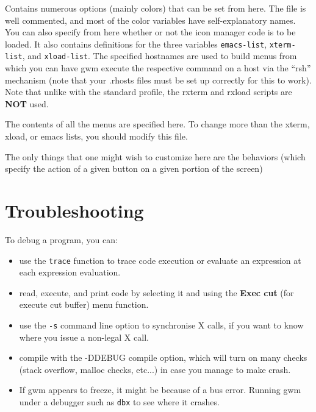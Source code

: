 \begin{description}

 Contains numerous options (mainly colors) that can be
set from here. The file is well commented, and most of the color
variables have self-explanatory names. You can also specify from here
whether or not the icon manager code is to be loaded.
It also contains definitions for the three variables
\verb"emacs-list", \verb"xterm-list", and \verb"xload-list". 
The specified hostnames are
used to build menus from which you can have gwm execute the respective
command on a host via the ``rsh'' mechanism (note that your .rhosts
files must be set up correctly for this to work). Note that unlike
with the standard profile, the rxterm and rxload scripts are {\bf NOT}
used.

 The contents of all the menus are specified
here. To change more than the xterm, xload, or emacs lists, you should
modify this file.

 The only things that one might wish to customize here are the
behaviors (which specify the action of a given button on a given
portion of the screen)
\end{description}

\section{Troubleshooting}

To debug a {\WOOL} program, you can:

\begin{itemize}

\item use the \verb"trace" function to trace code execution or evaluate an
expression at each expression evaluation.

\item read, execute, and print {\WOOL} code by selecting it and using
the {\bf Exec cut} (for execute cut buffer) menu function.

\item use the \verb"-s" command line option to synchronise X calls, if you want
to know where you issue a non-legal X call.

\item compile {\GWM} with the -DDEBUG compile option, which will turn on many
checks (stack overflow, malloc checks, etc...) in case you manage to make
{\GWM} crash.  

\item If gwm appears to freeze, it might be because of a bus
error. Running gwm under a debugger such as \verb|dbx| to see where it crashes.

\end{itemize}
